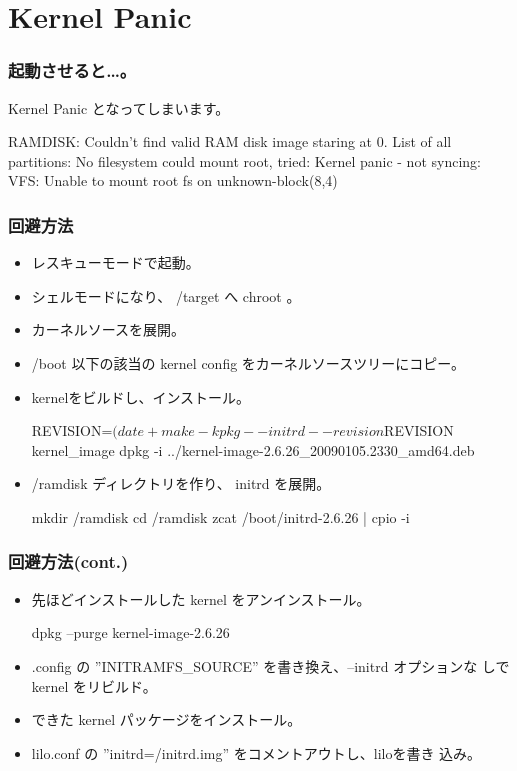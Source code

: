\section{Kernel Panic}

\begin{frame}[containsverbatim]
\frametitle{起動させると…。}
Kernel Panic となってしまいます。
\begin{commandline}
RAMDISK: Couldn't find valid RAM disk image staring at 0.
List of all partitions:
No filesystem could mount root, tried:
Kernel panic - not syncing: VFS: Unable to mount root fs on
 unknown-block(8,4)
\end{commandline}

\end{frame}

\begin{frame}[containsverbatim]
\frametitle{回避方法}
\begin{itemize}
\item レスキューモードで起動。
\item シェルモードになり、 /target へ chroot 。
\item カーネルソースを展開。
\item /boot 以下の該当の kernel config をカーネルソースツリーにコピー。
\item kernelをビルドし、インストール。
\begin{commandline}
REVISION=$(date +%
make-kpkg --initrd --revision $REVISION kernel_image
dpkg -i ../kernel-image-2.6.26_20090105.2330_amd64.deb
\end{commandline}

\item /ramdisk ディレクトリを作り、 initrd を展開。
\begin{commandline}
mkdir /ramdisk
cd /ramdisk
zcat /boot/initrd-2.6.26 | cpio -i
\end{commandline}
\end{itemize}
\end{frame}

\begin{frame}[containsverbatim]
\frametitle{回避方法(cont.)}
\begin{itemize}
\item 先ほどインストールした kernel をアンインストール。
\begin{commandline}
dpkg --purge kernel-image-2.6.26
\end{commandline}
\item .config の ''INITRAMFS\_SOURCE'' を書き換え、--initrd オプションな
      しで kernel をリビルド。
\item できた kernel パッケージをインストール。
\item lilo.conf の ''initrd=/initrd.img'' をコメントアウトし、liloを書き
      込み。
\end{itemize}

\end{frame}

